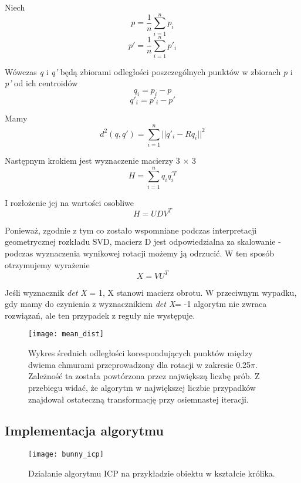 \documentclass[12pt]{article}
\begin{document}
Niech 
\[p = \frac{1}{n} \sum_{i=1}^n p_i \]
\[p' = \frac{1}{n} \sum_{i=1}^n p'_i \]

Wówczas \emph{q} i \emph{q'} będą zbiorami odległości poszczególnych punktów w zbiorach \emph{p} i \emph{p'} od ich centroidów
\[q_i = p_i - p \]
\[q'_{i} = p'_{i} - p' \]

Mamy
\[d^2(q, q') = \sum_{i=1}^n || q'_{i} - Rq_{i}||^2 \]

Następnym krokiem jest wyznaczenie macierzy 3 $\times$ 3 
\[H = \sum_{i=1}^n q_{i} q_{i}^{'T} \]

I rozłożenie jej na wartości osobliwe
\[H = UDV^T \]

Ponieważ, zgodnie z tym co zostało wspomniane podczas interpretacji geometrycznej rozkładu SVD, macierz D jest odpowiedzialna za skalowanie - podczas wyznaczenia wynikowej rotacji możemy ją odrzucić. W ten sposób otrzymujemy wyrażenie
\[X = VU^T \]

Jeśli wyznacznik \emph{det X} = 1, X stanowi macierz obrotu. W przeciwnym wypadku, gdy mamy do czynienia z wyznacznikiem \emph{det X}= -1 algorytm nie zwraca rozwiązań, ale ten przypadek z reguły nie występuje. 

\begin{figure}[h]
\centering
\texttt{[image: mean\_dist]}
\caption{Wykres średnich odległości korespondujących punktów między dwiema chmurami przeprowadzony dla rotacji w zakresie 0.25$\pi$. Zależność ta została powtórzona przez największą liczbę prób. Z przebiegu widać, że algorytm w największej liczbie przypadków znajdował ostateczną transformację przy osiemnastej iteracji.}
\end{figure}

\subsection{Implementacja algorytmu}

\begin{figure}[h]
\centering
\texttt{[image: bunny\_icp]}
\caption{Działanie algorytmu ICP na przykładzie obiektu w kształcie królika.}
\end{figure}
\end{document}
